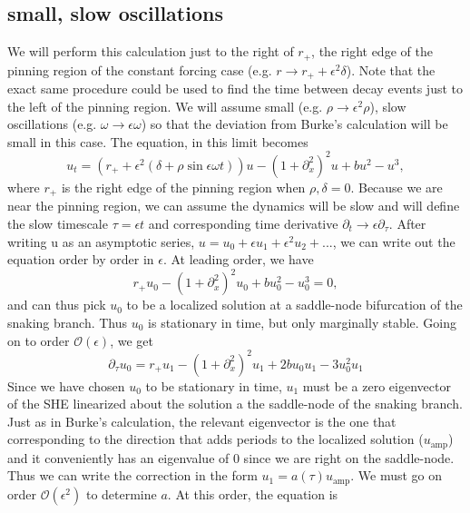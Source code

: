 \documentclass[pre,preprint,superscriptaddress]{revtex4-1}
\begin{document}
\subsection{small, slow oscillations}
We will perform this calculation just  to the right of $r_+$, the right edge of the pinning region of the constant forcing case (e.g. $r\rightarrow r_++\epsilon^2\delta$).  Note that the exact same procedure could be used to find the time between decay events just to the left of the pinning region.   We will assume small (e.g. $\rho\rightarrow \epsilon^2 \rho$), slow oscillations (e.g. $\omega\rightarrow \epsilon \omega$)  so that the deviation from Burke's calculation will be small in this case.  The equation, in this limit becomes 
\begin{equation}
u_t= \left(r_++ \epsilon^2(\delta+ \rho \sin\epsilon\omega t)\right) u-\left(1+\partial_{x}^2\right)^2u+b u^2-u^3\label{eq:SH},
\end{equation}
where $r_+$ is the right edge of the pinning region when $\rho,\delta=0$.  Because we are near the pinning region, we can assume the dynamics will be slow and will define the slow timescale $\tau=\epsilon t$ and corresponding time derivative $\partial_t\rightarrow\epsilon\partial_{\tau}$.  After writing u as an asymptotic series, $u=u_0+\epsilon u_1+\epsilon^2 u_2+...$, we can write out the equation order by order in $\epsilon$. At leading order, we have
\begin{equation}
r_+u_0-\left(1+\partial_{x}^2\right)^2u_0+b u_0^2-u_0^3=0\label{eq:SH},
\end{equation}
and can thus pick $u_0$ to be a localized solution at a saddle-node bifurcation of the snaking branch.  Thus $u_0$ is stationary in time, but only marginally stable.  Going on to order  $\mathcal{O}(\epsilon)$, we get
\begin{equation}
\partial_{\tau} u_0=r_+u_1-\left(1+\partial_{x}^2\right)^2u_1+2b u_0u_1-3u_0^2u_1\label{eq:SH}
\end{equation}
Since we have chosen $u_0$ to be stationary in time, $u_1$ must be a zero eigenvector of the SHE linearized about the solution a the saddle-node of the snaking branch.  Just as in Burke's calculation, the relevant eigenvector is the one that corresponding to the direction that adds periods to the localized solution ($u_{\text{amp}}$)  and it conveniently has an eigenvalue of 0 since we are right on the saddle-node.  Thus we can write the correction in the form $u_1=a( \tau)u_{\text{amp}}$.
We must go on order  $\mathcal{O}(\epsilon^2)$ to determine $a$.  At this order, the equation is
\end{document}
